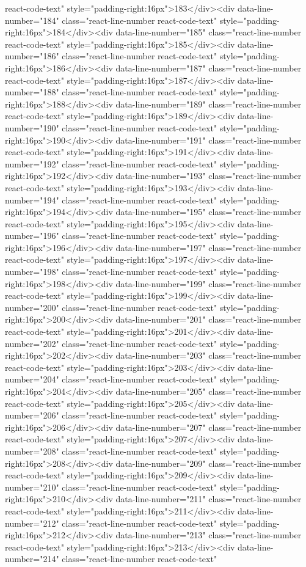 react-code-text" style="padding-right:16px">183</div><div data-line-number="184" class="react-line-number react-code-text" style="padding-right:16px">184</div><div data-line-number="185" class="react-line-number react-code-text" style="padding-right:16px">185</div><div data-line-number="186" class="react-line-number react-code-text" style="padding-right:16px">186</div><div data-line-number="187" class="react-line-number react-code-text" style="padding-right:16px">187</div><div data-line-number="188" class="react-line-number react-code-text" style="padding-right:16px">188</div><div data-line-number="189" class="react-line-number react-code-text" style="padding-right:16px">189</div><div data-line-number="190" class="react-line-number react-code-text" style="padding-right:16px">190</div><div data-line-number="191" class="react-line-number react-code-text" style="padding-right:16px">191</div><div data-line-number="192" class="react-line-number react-code-text" style="padding-right:16px">192</div><div data-line-number="193" class="react-line-number react-code-text" style="padding-right:16px">193</div><div data-line-number="194" class="react-line-number react-code-text" style="padding-right:16px">194</div><div data-line-number="195" class="react-line-number react-code-text" style="padding-right:16px">195</div><div data-line-number="196" class="react-line-number react-code-text" style="padding-right:16px">196</div><div data-line-number="197" class="react-line-number react-code-text" style="padding-right:16px">197</div><div data-line-number="198" class="react-line-number react-code-text" style="padding-right:16px">198</div><div data-line-number="199" class="react-line-number react-code-text" style="padding-right:16px">199</div><div data-line-number="200" class="react-line-number react-code-text" style="padding-right:16px">200</div><div data-line-number="201" class="react-line-number react-code-text" style="padding-right:16px">201</div><div data-line-number="202" class="react-line-number react-code-text" style="padding-right:16px">202</div><div data-line-number="203" class="react-line-number react-code-text" style="padding-right:16px">203</div><div data-line-number="204" class="react-line-number react-code-text" style="padding-right:16px">204</div><div data-line-number="205" class="react-line-number react-code-text" style="padding-right:16px">205</div><div data-line-number="206" class="react-line-number react-code-text" style="padding-right:16px">206</div><div data-line-number="207" class="react-line-number react-code-text" style="padding-right:16px">207</div><div data-line-number="208" class="react-line-number react-code-text" style="padding-right:16px">208</div><div data-line-number="209" class="react-line-number react-code-text" style="padding-right:16px">209</div><div data-line-number="210" class="react-line-number react-code-text" style="padding-right:16px">210</div><div data-line-number="211" class="react-line-number react-code-text" style="padding-right:16px">211</div><div data-line-number="212" class="react-line-number react-code-text" style="padding-right:16px">212</div><div data-line-number="213" class="react-line-number react-code-text" style="padding-right:16px">213</div><div data-line-number="214" class="react-line-number react-code-text" 